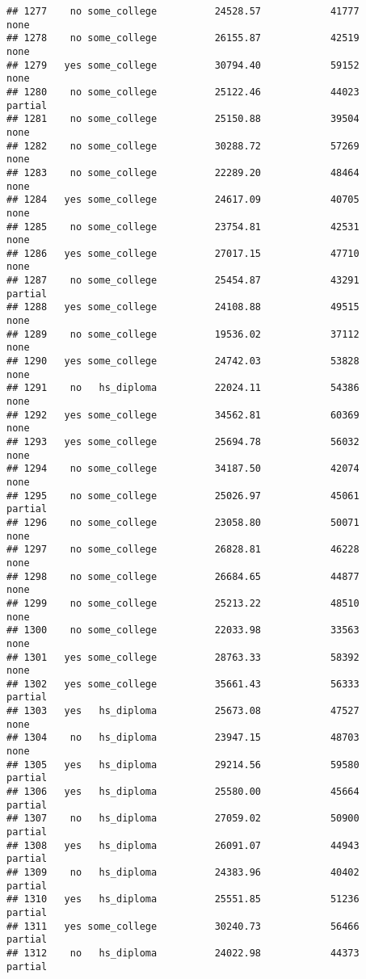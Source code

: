 \documentclass[
]{article}
\begin{document}
\begin{verbatim}
## 1277    no some_college          24528.57            41777        none
## 1278    no some_college          26155.87            42519        none
## 1279   yes some_college          30794.40            59152        none
## 1280    no some_college          25122.46            44023     partial
## 1281    no some_college          25150.88            39504        none
## 1282    no some_college          30288.72            57269        none
## 1283    no some_college          22289.20            48464        none
## 1284   yes some_college          24617.09            40705        none
## 1285    no some_college          23754.81            42531        none
## 1286   yes some_college          27017.15            47710        none
## 1287    no some_college          25454.87            43291     partial
## 1288   yes some_college          24108.88            49515        none
## 1289    no some_college          19536.02            37112        none
## 1290   yes some_college          24742.03            53828        none
## 1291    no   hs_diploma          22024.11            54386        none
## 1292   yes some_college          34562.81            60369        none
## 1293   yes some_college          25694.78            56032        none
## 1294    no some_college          34187.50            42074        none
## 1295    no some_college          25026.97            45061     partial
## 1296    no some_college          23058.80            50071        none
## 1297    no some_college          26828.81            46228        none
## 1298    no some_college          26684.65            44877        none
## 1299    no some_college          25213.22            48510        none
## 1300    no some_college          22033.98            33563        none
## 1301   yes some_college          28763.33            58392        none
## 1302   yes some_college          35661.43            56333     partial
## 1303   yes   hs_diploma          25673.08            47527        none
## 1304    no   hs_diploma          23947.15            48703        none
## 1305   yes   hs_diploma          29214.56            59580     partial
## 1306   yes   hs_diploma          25580.00            45664     partial
## 1307    no   hs_diploma          27059.02            50900     partial
## 1308   yes   hs_diploma          26091.07            44943     partial
## 1309    no   hs_diploma          24383.96            40402     partial
## 1310   yes   hs_diploma          25551.85            51236     partial
## 1311   yes some_college          30240.73            56466     partial
## 1312    no   hs_diploma          24022.98            44373     partial

\end{verbatim}
\end{document}
